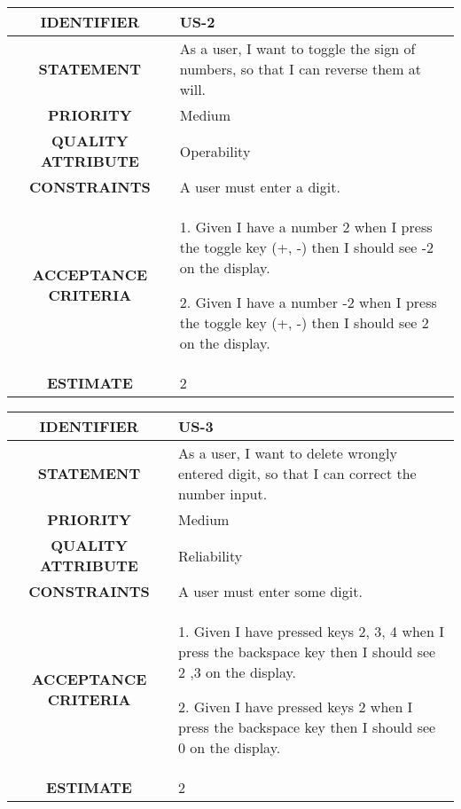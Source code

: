 \documentclass[12pt, a4paper]{article}
\begin{document}
\vspace*{2 cm}
    \begin{tabular}{|c|p{10cm}|}
    \hline
    \textbf{IDENTIFIER}     & US-2 \\
    \hline
    \textbf{STATEMENT} & As a user, I want to toggle the sign of numbers, so that I can reverse them at will.\\
    \hline
    \textbf{PRIORITY}     & Medium \\
    \hline
    \textbf{QUALITY ATTRIBUTE}     & Operability \\
    \hline
    \textbf{CONSTRAINTS}     & A user must enter a digit.\\
    \hline
    \textbf{ACCEPTANCE CRITERIA}    & 1.	Given I have a number 2 when I press the toggle key (+, -) then I should see -2 on the display.
    
    2.	Given I have a number -2 when I press the toggle key (+, -) then I should see 2 on the display.\\
    \hline
    \textbf{ESTIMATE}     & 2 \\
    \hline
    \end{tabular}

\vspace*{2 cm}

\begin{tabular}{|c|p{10cm}|}
    \hline
    \textbf{IDENTIFIER}     & US-3 \\
    \hline
    \textbf{STATEMENT} & As a user, I want to delete wrongly entered digit, so that I can correct the number input.\\
    \hline
    \textbf{PRIORITY}     & Medium \\
    \hline
    \textbf{QUALITY ATTRIBUTE}     & Reliability \\
    \hline
    \textbf{CONSTRAINTS}    & A user must enter some digit.\\
    \hline
    \textbf{ACCEPTANCE CRITERIA}    & 1.	Given I have pressed keys 2, 3, 4 when I press the backspace key then I should see 2 ,3 on the display.
    
    2.	Given I have pressed keys 2 when I press the backspace key then I should see 0 on the display.\\
    \hline
    \textbf{ESTIMATE}     & 2 \\
    \hline 
    \end{tabular}
\end{document}
